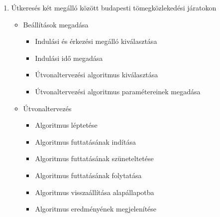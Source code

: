 \begin{enumerate}
    \item Útkeresés két megálló között budapesti tömegközlekedési járatokon
    \begin{itemize}
        \item Beállítások megadása
        \begin{itemize}
            \item Indulási és érkezési megálló kiválasztása
            \item Indulási idő megadása
            \item Útvonaltervezési algoritmus kiválasztása
            \item Útvonaltervezési algoritmus paramétereinek megadása
        \end{itemize}
        \item Útvonaltervezés
        \begin{itemize}
            \item Algoritmus léptetése
            \item Algoritmus futtatásának indítása
            \item Algoritmus futtatásának szüneteltetése
            \item Algoritmus futtatásának folytatása
            \item Algoritmus visszaállítása alapállapotba
            \item Algoritmus eredményének megjelenítése
        \end{itemize}
    \end{itemize}
\end{enumerate}

